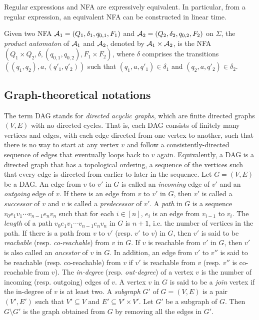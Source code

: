 \begin{proposition}[\cite{HU79}]
Regular expressions and NFA are expressively equivalent. In particular, from a regular expression, an equivalent NFA can be constructed in linear time.
\end{proposition}

Given two NFA $\mathcal{A}_1=(Q_1, \delta_1, q_{0,1}, F_1)$ and $\mathcal{A}_2=(Q_2, \delta_2, q_{0,2}, F_2)$ on $\Sigma$, the \emph{product automaton} of $\mathcal{A}_1$ and $\mathcal{A}_2$, denoted by $\mathcal{A}_1 \times \mathcal{A}_2$, is the NFA $(Q_1 \times Q_2, \delta, (q_{0,1}, q_{0,2}), F_1 \times F_2)$, where $\delta$ comprises the transitions $((q_1, q_2), a, (q'_1, q'_2))$ such that $(q_1, a, q'_1) \in \delta_1$ and $(q_2, a, q'_2) \in \delta_2$.  

\subsection*{Graph-theoretical notations}
The term DAG stands for \emph{directed acyclic graphs}, which are finite directed graphs $(V, E)$ with no directed cycles. That is, each DAG consists of finitely many vertices and edges, with each edge directed from one vertex to another, such that there is no way to start at any vertex $v$ and follow a consistently-directed sequence of edges that eventually loops back to $v$ again. Equivalently, a DAG is a directed graph that has a topological ordering, a sequence of the vertices such that every edge is directed from earlier to later in the sequence. Let $G=(V,E)$ be a DAG. An edge from $v$ to $v'$ in $G$ is called an \emph{incoming} edge of $v'$ and an \emph{outgoing} edge of $v$. If there is an edge from $v$ to $v'$ in $G$, then $v'$ is called a \emph{successor} of $v$ and $v$ is called a \emph{predecessor} of $v'$. A \emph{path} in $G$ is a sequence $v_0 e_1 v_1 \cdots v_{n-1} e_n v_n$ such that for each $i \in [n]$, $e_i$ is an edge from $v_{i-1}$ to $v_i$. The \emph{length} of a path $v_0 e_1 v_1 \cdots v_{n-1} e_n v_n$ in $G$ is $n+1$, i.e. the number of vertices in the path. If there is a path from $v$ to $v'$ (resp. $v'$ to $v$) in $G$, then $v'$ is said to be \emph{reachable} (resp. \emph{co-reachable}) from $v$ in $G$. If $v$ is reachable from $v'$ in $G$, then $v'$ is also called an \emph{ancestor} of $v$ in $G$. In addition, an edge from $v'$ to $v''$ is said to be reachable (resp. co-reachable) from $v$ if $v'$ is reachable from $v$ (resp. $v''$ is co-reachable from $v$). The \emph{in-degree} (resp. \emph{out-degree}) of a vertex $v$ is the number of incoming (resp. outgoing) edges of $v$. A vertex $v$ in $G$ is said to be a \emph{join} vertex if the in-degree of $v$ is at least two. 
A \emph{subgraph} $G'$ of $G=(V,E)$ is a pair $(V', E')$ such that $V' \subseteq V$ and $E' \subseteq V' \times V'$. Let $G'$ be a subgraph of $G$. Then $G \setminus G'$ is the graph obtained from $G$ by removing all the edges in $G'$. 


